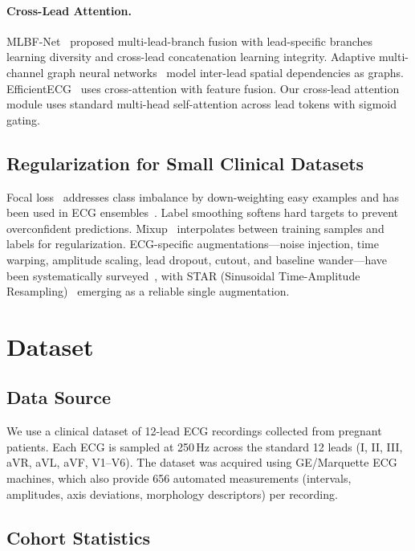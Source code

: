 \documentclass[11pt,a4paper]{article}
\begin{document}
\paragraph{Cross-Lead Attention.}
MLBF-Net~\cite{mlbf2020} proposed multi-lead-branch fusion with lead-specific branches learning diversity and cross-lead concatenation learning integrity. Adaptive multi-channel graph neural networks~\cite{gnn2025} model inter-lead spatial dependencies as graphs. EfficientECG~\cite{efficientecg2025} uses cross-attention with feature fusion. Our cross-lead attention module uses standard multi-head self-attention across lead tokens with sigmoid gating.

\subsection{Regularization for Small Clinical Datasets}

Focal loss~\cite{lin2017} addresses class imbalance by down-weighting easy examples and has been used in ECG ensembles~\cite{focalloss2022}. Label smoothing softens hard targets to prevent overconfident predictions. Mixup~\cite{zhang2018} interpolates between training samples and labels for regularization. ECG-specific augmentations---noise injection, time warping, amplitude scaling, lead dropout, cutout, and baseline wander---have been systematically surveyed~\cite{augsurvey2023}, with STAR (Sinusoidal Time-Amplitude Resampling)~\cite{star2025} emerging as a reliable single augmentation.


\section{Dataset}
\label{sec:dataset}

\subsection{Data Source}

We use a clinical dataset of 12-lead ECG recordings collected from pregnant patients. Each ECG is sampled at 250\,Hz across the standard 12 leads (I, II, III, aVR, aVL, aVF, V1--V6). The dataset was acquired using GE/Marquette ECG machines, which also provide 656 automated measurements (intervals, amplitudes, axis deviations, morphology descriptors) per recording.

\subsection{Cohort Statistics}
\end{document}
